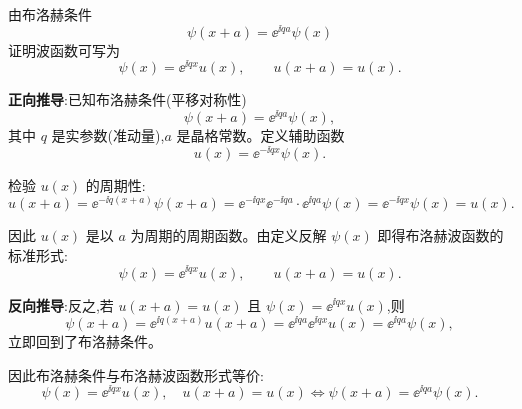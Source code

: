 \begin{question}
由布洛赫条件
\[
\psi(x+a)=\ee^{\ii qa}\psi(x)
\]
证明波函数可写为
\[
\psi(x)=\ee^{\ii qx}u(x),\qquad u(x+a)=u(x).
\]
\begin{solution}
	\textbf{正向推导}:已知布洛赫条件(平移对称性)
	\[
	\psi(x+a)=\ee^{\ii qa}\psi(x),
	\]
	其中 $q$ 是实参数(准动量),$a$ 是晶格常数。定义辅助函数
	\[
	u(x)=\ee^{-\ii qx}\psi(x).
	\]

	检验 $u(x)$ 的周期性:
	\[
	u(x+a)=\ee^{-\ii q(x+a)}\psi(x+a)
	=\ee^{-\ii qx}\ee^{-\ii qa}\cdot \ee^{\ii qa}\psi(x)
	=\ee^{-\ii qx}\psi(x)=u(x).
	\]

	因此 $u(x)$ 是以 $a$ 为周期的周期函数。由定义反解 $\psi(x)$ 即得布洛赫波函数的标准形式:
	\[
	\psi(x)=\ee^{\ii qx}u(x),\qquad u(x+a)=u(x).
	\]

	\textbf{反向推导}:反之,若 $u(x+a)=u(x)$ 且 $\psi(x)=\ee^{\ii qx}u(x)$,则
	\[
	\psi(x+a)=\ee^{\ii q(x+a)}u(x+a)=\ee^{\ii qa}\ee^{\ii qx}u(x)=\ee^{\ii qa}\psi(x),
	\]
	立即回到了布洛赫条件。

	因此布洛赫条件与布洛赫波函数形式等价:
	\[
	\boxed{\psi(x)=\ee^{\ii qx}u(x),\quad u(x+a)=u(x)
	\Longleftrightarrow \psi(x+a)=\ee^{\ii qa}\psi(x)}.
	\]
	\end{solution}
\end{question}

